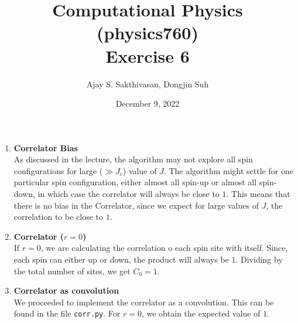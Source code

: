 \documentclass{article}
\title{Computational Physics (physics760)\\Exercise 6}
\author{Ajay S. Sakthivasan, Dongjin Suh}
\date{December 9, 2022}
\begin{document}
\maketitle

\begin{enumerate}

\item   \textbf{Correlator Bias}\\
As discussed in the lecture, the algorithm may not explore all spin configurations for large ($\gg J_c$) value of $J$. The algorithm might settle for one particular spin configuration, either almost all spin-up or almost all spin-down, in which case the correlator will always be close to $1$. This means that there is no bias in the Correlator, since we expect for large values of $J$, the correlation to be close to $1$.

\item \textbf{Correlator ($r = 0$)}\\
If $r=0$, we are calculating the correlation o each spin site with itself. Since, each spin can either up or down, the product will always be $1$. Dividing by the total number of sites, we get $C_0 = 1$.

\item \textbf{Correlator as convolution}\\
We proceeded to implement the correlator as a convolution. This can be found in the file \texttt{corr.py}. For $r=0$, we obtain the expected value of $1$.


\end{enumerate}
\end{document}
